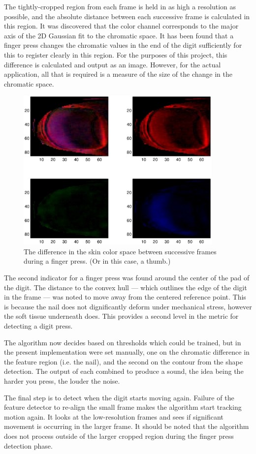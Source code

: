 The tightly-cropped region from each frame is held in as high a resolution as possible, and the absolute distance between each successive frame is calculated in this region. It was discovered that the color channel corresponds to the major axis of the 2D Gaussian fit to the chromatic space. It has been found that a finger press changes the chromatic values in the end of the digit sufficiently for this to register clearly in this region. For the purposes of this project, this difference is calculated and output as an image. However, for the actual application, all that is required is a measure of the size of the change in the chromatic space.

\begin{figure}[h!]
  \centering
    \includegraphics[width=0.90\textwidth]{Chapter2/Figs/jThumb_Final_Proof.eps}
    \caption{The difference in the skin color space between successive frames during a finger press. (Or in this case, a thumb.)}\label{fig:FinalProof}
\end{figure}

The second indicator for a finger press was found around the center of the pad of the digit. The distance to the convex hull --- which outlines the edge of the digit in the frame --- was noted to move away from the centered reference point. This is because the nail does not dignificantly deform under mechanical stress, however the soft tissue underneath does. This provides a second level in the metric for detecting a digit press.

The algorithm now decides based on thresholds which could be trained, but in the present implementation were set manually, one on the chromatic difference in the feature region (i.e. the nail), and the second on the contour from the shape detection. The output of each combined to produce a sound, the idea being the harder you press, the louder the noise.

The final step is to detect when the digit starts moving again. Failure of the feature detector to re-align the small frame makes the algorithm start tracking motion again. It looks at the low-resolution frames and sees if significant movement is occurring in the larger frame. It should be noted that the algorithm does not process outside of the larger cropped region during the finger press detection phase.
